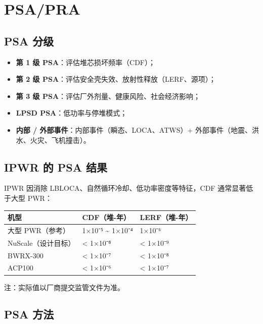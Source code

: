 \documentclass[
  UTF8,
  scheme=plain,
  fontsize=10pt,
  openany
]{ctexbook}
\begin{document}
\section{PSA/PRA}\label{psapra}

\subsection{PSA 分级}\label{psa-ux5206ux7ea7}

\begin{itemize}
\tightlist
\item
  \textbf{第 1 级 PSA}：评估堆芯损坏频率（CDF）；
\item
  \textbf{第 2 级 PSA}：评估安全壳失效、放射性释放（LERF、源项）；
\item
  \textbf{第 3 级 PSA}：评估厂外剂量、健康风险、社会经济影响；
\item
  \textbf{LPSD PSA}：低功率与停堆模式；
\item
  \textbf{内部 / 外部事件}：内部事件（瞬态、LOCA、ATWS）+
  外部事件（地震、洪水、火灾、飞机撞击）。
\end{itemize}

\subsection{IPWR 的 PSA 结果}\label{ipwr-ux7684-psa-ux7ed3ux679c}

IPWR 因消除 LBLOCA、自然循环冷却、低功率密度等特征，CDF 通常显著低于大型
PWR：

{\def\LTcaptype{none} %
\begin{longtable}[]{@{}lll@{}}
\toprule\noalign{}
机型 & CDF（堆-年） & LERF（堆-年） \\
\midrule\noalign{}
\endhead
\bottomrule\noalign{}
\endlastfoot
大型 PWR（参考） & 1×10⁻⁵ \textasciitilde{} 1×10⁻⁴ & 1×10⁻⁶ \\
NuScale（设计目标） & \textless{} 1×10⁻⁸ & \textless{} 1×10⁻⁹ \\
BWRX-300 & \textless{} 1×10⁻⁷ & \textless{} 1×10⁻⁸ \\
ACP100 & \textless{} 1×10⁻⁶ & \textless{} 1×10⁻⁷ \\
\end{longtable}
}

注：实际值以厂商提交监管文件为准。

\subsection{PSA 方法}\label{psa-ux65b9ux6cd5}
\end{document}
